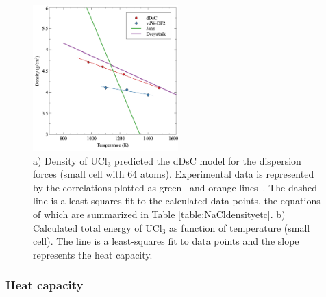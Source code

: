 \documentclass[preprint,3p,10pt,onecolumn,number,sort&compress]{elsarticle}
\begin{document}
\begin{figure}[htb]
\centering
\includegraphics[width=0.5\textwidth]{fig5.jpg}
\caption{a) Density of UCl$_3$ predicted the dDsC model for the dispersion forces (small cell with 64 atoms). Experimental data is represented by the correlations plotted as green~\cite{Desyatnik} and orange lines~\cite{Janz1988}. The dashed line is a least-squares fit to the calculated data points, the equations of which are summarized in Table \ref{table:NaCldensityetc}. b) Calculated total energy of UCl$_3$ as function of temperature (small cell). The line is a least-squares fit to data points and the slope represents the heat capacity.} 
\label{fig:UCl3density}
\end{figure}

\subsubsection{Heat capacity} 
\end{document}
